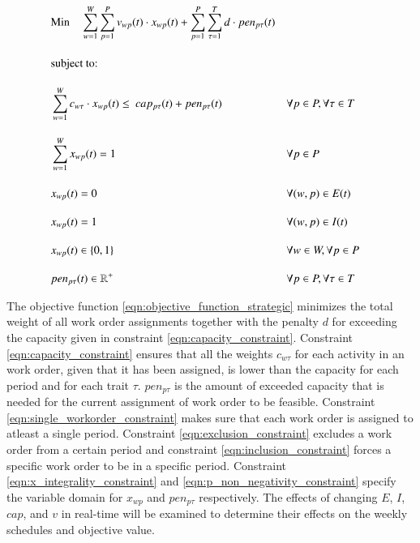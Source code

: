 \documentclass[preprint,12pt,authoryear]{elsarticle}
\begin{document}
\begin{alignat}{2}
	& \text{Min} \quad \sum_{w = 1}^{W} \sum_{p = 1}^{P} v_{wp}(t) \cdot x_{wp}(t) + \sum_{p = 1}^{P} \sum_{\tau = 1}^T d \cdot pen_{p\tau}(t)   \label{eqn:objective_function_strategic} \\[1em]
    & \text{subject to:} \notag                                                                                                                                        \\[1em]
	& \sum_{w = 1}^W c_{w\tau} \cdot x_{wp}(t) \leq \ cap_{p\tau}(t) + pen_{p\tau}(t)        && \forall p \in P, \forall \tau \in T                      \label{eqn:capacity_constraint}          \\[1em]
	& \sum_{w = 1}^{W} x_{wp}(t) = 1                                            && \forall p \in P                                       \label{eqn:single_workorder_constraint}  \\[1em]
	& x_{wp}(t) = 0                                                             && \forall (w, p) \in E(t)                               \label{eqn:exclusion_constraint}         \\[1em]
	& x_{wp}(t) = 1                                                             && \forall (w, p) \in I(t)                               \label{eqn:inclusion_constraint}         \\[1em]
	& x_{wp}(t) \in \{0, 1\}                                                    && \forall w \in W, \forall p \in P                      \label{eqn:x_integrality_constraint}     \\[1em] 
	& pen_{p\tau}(t) \in \mathbb{R}^{+}                                         && \forall p \in P, \forall \tau \in T                      \label{eqn:p_non_negativity_constraint}
\end{alignat}

The objective function \ref{eqn:objective_function_strategic} minimizes the total weight of all work order assignments together with the penalty $d$ for exceeding the 
capacity given in constraint \ref{eqn:capacity_constraint}. Constraint \ref{eqn:capacity_constraint} ensures that all the weights $c_{w\tau}$ for each activity in an work order, given that it
has been assigned, is lower than the capacity for each period and for each trait $\tau$. $pen_{p\tau}$ is the amount of exceeded capacity that is needed for the current assignment of work order to be feasible.
Constraint \ref{eqn:single_workorder_constraint} makes sure that each work order is assigned to atleast a single period. Constraint \ref{eqn:exclusion_constraint} excludes a work order from a 
certain period and constraint \ref{eqn:inclusion_constraint} forces a specific work order to be in a specific period. Constraint \ref{eqn:x_integrality_constraint} and \ref{eqn:p_non_negativity_constraint} 
specify the variable domain for $x_{wp}$ and $pen_{p\tau}$ respectively. The effects of changing $E$, $I$, $cap$, and $v$ in real-time will be examined to determine their effects on the weekly schedules and objective value.
\end{document}
